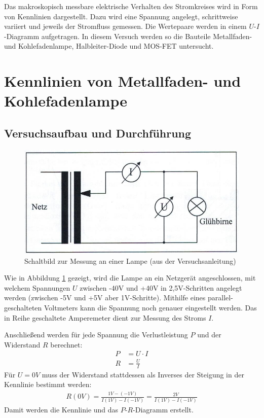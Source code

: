 \documentclass{scrartcl}
\begin{document}
Das makroskopisch messbare elektrische Verhalten des Stromkreises wird in Form von Kennlinien dargestellt. Dazu wird eine Spannung angelegt, schrittweise variiert und jeweils der Stromfluss gemessen. Die Wertepaare werden in einem $U$-$I$-Diagramm aufgetragen. In diesem Versuch werden so die Bauteile Metallfaden- und Kohlefadenlampe, Halbleiter-Diode und MOS-FET untersucht.




\pagebreak
\section{Kennlinien von Metallfaden- und Kohlefadenlampe}
\subsection{Versuchsaufbau und Durchführung}

\begin{figure}[H]
  \centering
    \includegraphics[scale=0.75]{Aufbau1.JPG}
  \caption{Schaltbild zur Messung an einer Lampe (aus der Versuchsanleitung)}
  \label{fig:Aufbau1}
\end{figure}

Wie in Abbildung \ref{fig:Aufbau1} gezeigt, wird die Lampe an ein Netzgerät angeschlossen, mit welchem Spannungen $U$ zwischen -40V und +40V in 2,5V-Schritten angelegt werden (zwischen -5V und +5V aber 1V-Schritte). Mithilfe eines parallel-geschalteten Voltmeters kann die Spannung noch genauer eingestellt werden. Das in Reihe geschaltete Amperemeter dient zur Messung des Stroms $I$.

Anschließend werden für jede Spannung die Verlustleistung $P$ und der Widerstand $R$ berechnet:
\begin{align}
P &= U \cdot I \\
R &= \frac{U}{I}
\end{align}
Für $U = 0V$ muss der Widerstand stattdessen als Inverses der Steigung in der Kennlinie bestimmt werden:
\begin{align}
R(0V) = \frac{1V-(-1V)}{I(1V)-I(-1V)} = \frac{2V}{I(1V)-I(-1V)}
\end{align}
Damit werden die Kennlinie und das $P$-$R$-Diagramm erstellt.
\end{document}
